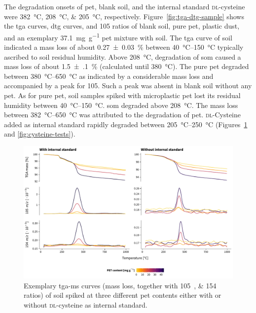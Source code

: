 The degradation onsets of \ac{pet}, blank soil, and the internal standard \textsc{dl}-cysteine were \SIlist{382;208;205}{\degreeCelsius}, respectively. Figure~\ref{fig:tga-dtg-sample} shows the \ac{tga} curves, \acf{dtg} curves, and \SI{105}{\mz} ratios of blank soil, pure \ac{pet}, plastic dust, and an exemplary \SI{37.1}{\milli\gram\per\gram} \ac{pet} mixture with soil. The \ac{tga} curve of soil indicated a mass loss of about \SI{0.27(3)}{\percent} between \SIrange[range-phrase = { and }]{40}{150}{\degreeCelsius} typically ascribed to soil residual humidity.
Above \SI{208}{\degreeCelsius}, degradation of \ac{som} caused a mass loss of about \SI{1.5(1)}{\percent} (calculated until \SI{380}{\degreeCelsius}). The pure \ac{pet} degraded between \SIrange[range-phrase = { and }]{380}{650}{\degreeCelsius} as indicated by a considerable mass loss and accompanied by a peak for \SI{105}{\mz}.
Such a peak was absent in blank soil without any \ac{pet}. As for pure \ac{pet}, soil samples spiked with microplastic \ac{pet} lost its residual humidity between \SIrange[range-phrase = { and }]{40}{150}{\degreeCelsius}.
\Ac{som} degraded above \SI{208}{\degreeCelsius}. The mass loss between \SIrange[range-phrase = { and }]{382}{650}{\degreeCelsius} was attributed to the degradation of \ac{pet}. \textsc{dl}-Cysteine added as internal standard rapidly degraded between \SIrange[range-phrase = { and }]{205}{250}{\degreeCelsius} (Figures~\ref{fig:tga-ms} and \ref{fig:cysteine-tests}).

\begin{figure}
	\includegraphics[width=\textwidth]{figures/tga-ms}
	\caption[Exemplary \ac{tga-ms} curves of soil spiked at three different \ac{pet} contents with or without internal standard.]{Exemplary \ac{tga-ms} curves (mass loss, together with \SIlist{105;154}{\mz} ratios) of soil spiked at three different \ac{pet} contents either with or without \textsc{dl}-cysteine as internal standard.}
	\label{fig:tga-ms}
\end{figure}

